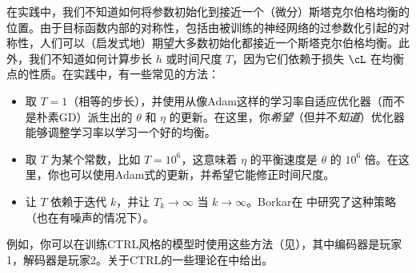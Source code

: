\documentclass[../../book-main.tex]{subfiles}
\begin{document}
在实践中，我们不知道如何将参数初始化到接近一个（微分）斯塔克尔伯格均衡的位置。由于目标函数内部的对称性，包括由被训练的神经网络的过参数化引起的对称性，人们可以（启发式地）期望大多数初始化都接近一个斯塔克尔伯格均衡。此外，我们不知道如何计算步长 \(h\) 或时间尺度 \(T\)，因为它们依赖于损失 \(\cL\) 在均衡点的性质。在实践中，有一些常见的方法：
\begin{itemize}
    \item 取 \(T = 1\)（相等的步长），并使用从像Adam这样的学习率自适应优化器（而不是朴素GD）派生出的 \(\theta\) 和 \(\eta\) 的更新。在这里，你\textit{希望}（但并不\textit{知道}）优化器能够调整学习率以学习一个好的均衡。
    \item 取 \(T\) 为某个常数，比如 \(T = 10^{6}\)，这意味着 \(\eta\) 的平衡速度是 \(\theta\) 的 \(10^{6}\) 倍。在这里，你也可以使用Adam式的更新，并希望它能修正时间尺度。
    \item 让 \(T\) 依赖于迭代 \(k\)，并让 \(T_{k} \to \infty\) 当 \(k \to \infty\)。Borkar在 \cite{borkar1997stochastic} 中研究了这种策略（也在有噪声的情况下）。
\end{itemize}
例如，你可以在训练CTRL风格的模型时使用这些方法（见），其中编码器是玩家1，解码器是玩家2。关于CTRL的一些理论在中给出。
\end{document}
